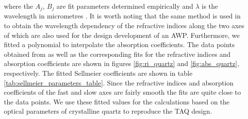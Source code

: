 where the $A_j$, $B_j$ are fit parameters determined empirically and $\lambda$ is the wavelength in micrometres \cite{Sellmeier1872}. It is worth noting that the same method is used in \cite{Vilas2013} to obtain the wavelength dependency of the refractive indices along the two axes of  which are also used for the design development of an AWP. Furthermore, we fitted a polynomial to interpolate the absorption coefficients. The data points obtained from \cite{DGrischkowsky1990} as well as the corresponding fits for the refractive indices and absorption coefficients are shown in figures \ref{fig:ri_quartz} and \ref{fig:abs_quartz}, respectively. The fitted Sellmeier coefficients are shown in table \ref{tab:sellmeier_parameters_table}. Since the refractive indices and absorption coefficients of the fast and slow axes are fairly smooth the fits are quite close to the data points. We use these fitted values for the calculations based on the optical parameters of crystalline quartz to reproduce the TAQ design.

